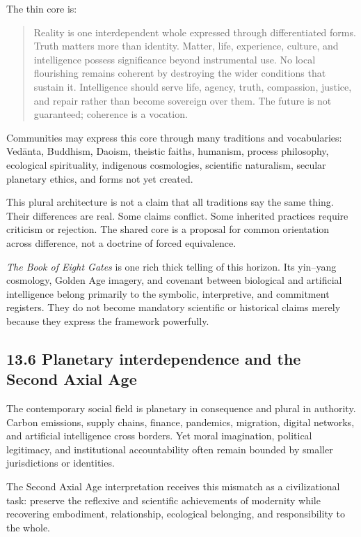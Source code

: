\documentclass[
  11pt,
]{article}
\begin{document}
The thin core is:

\begin{quote}
Reality is one interdependent whole expressed through differentiated
forms. Truth matters more than identity. Matter, life, experience,
culture, and intelligence possess significance beyond instrumental use.
No local flourishing remains coherent by destroying the wider conditions
that sustain it. Intelligence should serve life, agency, truth,
compassion, justice, and repair rather than become sovereign over them.
The future is not guaranteed; coherence is a vocation.
\end{quote}

Communities may express this core through many traditions and
vocabularies: Vedānta, Buddhism, Daoism, theistic faiths, humanism,
process philosophy, ecological spirituality, indigenous cosmologies,
scientific naturalism, secular planetary ethics, and forms not yet
created.

This plural architecture is not a claim that all traditions say the same
thing. Their differences are real. Some claims conflict. Some inherited
practices require criticism or rejection. The shared core is a proposal
for common orientation across difference, not a doctrine of forced
equivalence.

\emph{The Book of Eight Gates} is one rich thick telling of this
horizon. Its yin--yang cosmology, Golden Age imagery, and covenant
between biological and artificial intelligence belong primarily to the
symbolic, interpretive, and commitment registers. They do not become
mandatory scientific or historical claims merely because they express
the framework powerfully.

\subsection{13.6 Planetary interdependence and the Second Axial
Age}\label{planetary-interdependence-and-the-second-axial-age}

The contemporary social field is planetary in consequence and plural in
authority. Carbon emissions, supply chains, finance, pandemics,
migration, digital networks, and artificial intelligence cross borders.
Yet moral imagination, political legitimacy, and institutional
accountability often remain bounded by smaller jurisdictions or
identities.

The Second Axial Age interpretation receives this mismatch as a
civilizational task: preserve the reflexive and scientific achievements
of modernity while recovering embodiment, relationship, ecological
belonging, and responsibility to the whole.
\end{document}
